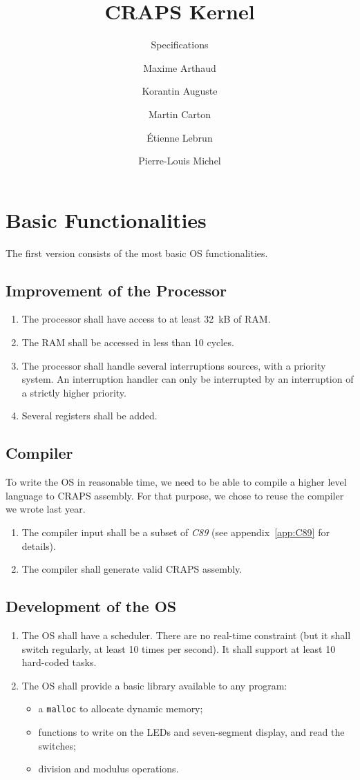 \documentclass{article}
\title{CRAPS Kernel}
\subtitle{Specifications}
\author{
       Maxime Arthaud
  \and Korantin Auguste
  \and Martin Carton
  \and Étienne Lebrun
  \and Pierre-Louis Michel
}
\begin{document}
  
  \newpage
    \section{Basic Functionalities}
      The first version consists of the most basic OS functionalities.

      \subsection{Improvement of the Processor}
        \begin{enumerate}
          \item The processor shall have access to at least \SI{32}{kB} of RAM.
          \item The RAM shall be accessed in less than 10 cycles.
          \item The processor shall handle several interruptions sources, with
            a priority system. An interruption handler can only be interrupted
            by an interruption of a strictly higher priority.
          \item Several registers shall be added.
        \end{enumerate}

      \subsection{Compiler}
        To write the OS in reasonable time, we need to be able to compile a
        higher level language to CRAPS assembly. For that purpose, we chose to
        reuse the compiler we wrote last year.
        \begin{enumerate}
          \item The compiler input shall be a subset of \textit{C89} (see
            appendix~\ref{app:C89} for details).
          \item The compiler shall generate valid CRAPS assembly.
        \end{enumerate}

      \subsection{Development of the OS}
        \begin{enumerate}
          \item The OS shall have a scheduler. There are no real-time
          constraint (but it shall switch regularly, at least 10 times per
          second). It shall support at least 10 hard-coded tasks.
          \item The OS shall provide a basic library available to any program:
            \begin{itemize}
              \item a \verb+malloc+ to allocate dynamic memory;
              \item functions to write on the LEDs and seven-segment display,
                and read the switches;
              \item division and modulus operations.
             \end{itemize}
        \end{enumerate}
\end{document}
